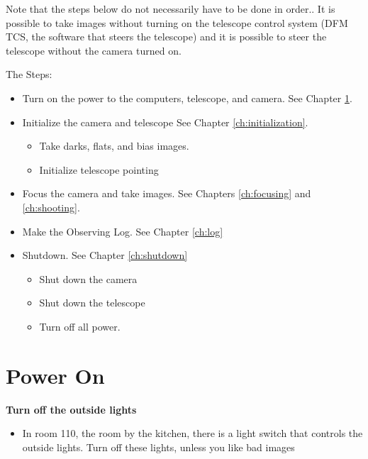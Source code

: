 \documentclass[letterpaper, 12pt]{report}
\begin{document}
Note that the steps below do not necessarily have to be done in order.. It is possible to take images without turning on the telescope control system (DFM TCS, the software that steers the telescope) and it is possible to steer the telescope without the camera turned on.

The Steps:
\begin{itemize}
	\item Turn on the power to the computers, telescope, and camera. See Chapter \ref{ch:power}.
	\item Initialize the camera and telescope See Chapter \ref{ch:initialization}.
	\begin{itemize}
		\item Take darks, flats, and bias images.
		\item Initialize telescope pointing
	\end{itemize}
	\item Focus the camera and take images. See Chapters \ref{ch:focusing} and \ref{ch:shooting}.
	\item Make the Observing Log. See Chapter \ref{ch:log}
	\item Shutdown. See Chapter \ref{ch:shutdown}
	\begin{itemize}
		\item Shut down the camera
		\item Shut down the telescope
		\item Turn off all power.
	\end{itemize}
\end{itemize}

\newpage

\chapter{Power On}\label{ch:power}

\textbf{Turn off the outside lights}
\begin{itemize}
	\item In room 110, the room by the kitchen, there is a light switch that controls the outside lights. Turn off these lights, unless you like bad images
\end{itemize}
\end{document}
